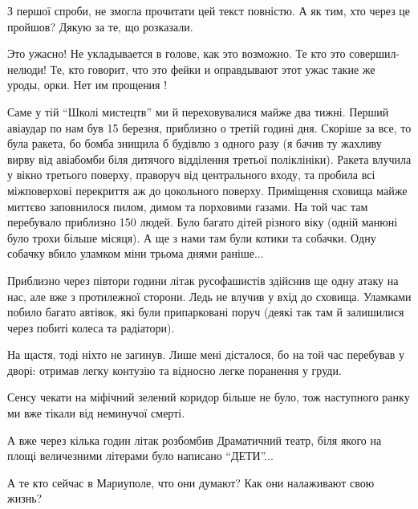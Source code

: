 \begin{itemize}

З першої спроби, не змогла прочитати цей текст повністю. А як тим, хто через це
пройшов? Дякую за те, що розказали.


Это ужасно! Не укладывается в голове, как это возможно. Те кто это совершил-
нелюди! Те, кто говорит, что это фейки и оправдывают этот ужас такие же уроды,
орки. Нет им прощения !


Саме у тій \enquote{Школі мистецтв} ми й переховувалися майже два тижні. Перший
авіаудар по нам був 15 березня, приблизно о третій годині дня. Скоріше за все,
то була ракета, бо бомба знищила б будівлю з одного разу (я бачив ту жахливу
вирву від авіабомби біля дитячого відділення третьої поліклініки). Ракета
влучила у вікно третього поверху, праворуч від центрального входу, та пробила
всі міжповерхові перекриття аж до цокольного поверху. Приміщення сховища майже
миттєво заповнилося пилом, димом та порховими газами. На той час там перебувало
приблизно 150 людей. Було багато дітей різного віку (одній манюні було трохи
більше місяця). А ще з нами там були котики та собачки. Одну собачку вбило
уламком міни трьома днями раніше...

Приблизно через півтори години літак русофашистів здійснив ще одну атаку на
нас, але вже з протилежної сторони. Ледь не влучив у вхід до сховища. Уламками
побило багато автівок, які були припарковані поруч (деякі так там й залишилися
через побиті колеса та радіатори).

На щастя, тоді ніхто не загинув. Лише мені дісталося, бо на той час перебував у
дворі: отримав легку контузію та відносно легке поранення у груди.

Сенсу чекати на міфічний зелений коридор більше не було, тож наступного ранку
ми вже тікали від неминучої смерті.

А вже через кілька годин літак розбомбив Драматичний театр, біля якого на площі
величезними літерами було написано \enquote{ДЕТИ}...


А те кто сейчас в Мариуполе, что они думают? Как они налаживают свою жизнь?


\end{itemize} %
